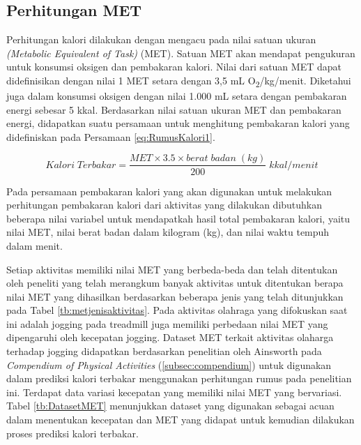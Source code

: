 \subsection{Perhitungan MET}
\label{subsec:PrediksiPerhitungan}

Perhitungan kalori dilakukan dengan mengacu pada nilai satuan ukuran \emph{(Metabolic Equivalent of Task)} (MET). Satuan MET akan mendapat pengukuran untuk konsumsi oksigen dan pembakaran kalori. Nilai dari satuan MET dapat didefinisikan dengan nilai 1 MET setara dengan 3,5 mL O\textsubscript{2}/kg/menit. Diketahui juga dalam konsumsi oksigen dengan nilai 1.000 mL setara dengan pembakaran energi sebesar 5 kkal. Berdasarkan nilai satuan ukuran MET dan pembakaran energi, didapatkan suatu persamaan untuk menghitung pembakaran kalori yang didefiniskan pada Persamaan \ref{eq:RumusKalori1}.

\setcounter{chapter}{2}
\setcounter{equation}{0}
\begin{equation}
  Kalori \; Terbakar = \frac{MET \times 3.5 \times berat \; badan \; (kg)}{200} \; kkal/menit
\end{equation}
\setcounter{chapter}{3}
\setcounter{equation}{4}

Pada persamaan pembakaran kalori yang akan digunakan untuk melakukan perhitungan pembakaran kalori dari aktivitas yang dilakukan dibutuhkan beberapa nilai variabel untuk mendapatkah hasil total pembakaran kalori, yaitu nilai MET, nilai berat badan dalam kilogram (kg), dan nilai waktu tempuh dalam menit.

Setiap aktivitas memiliki nilai MET yang berbeda-beda dan telah ditentukan oleh peneliti yang telah merangkum banyak aktivitas untuk ditentukan berapa nilai MET yang dihasilkan berdasarkan beberapa jenis yang telah ditunjukkan pada Tabel \ref{tb:metjenisaktivitas}. Pada aktivitas olahraga yang difokuskan saat ini adalah jogging pada treadmill juga memiliki perbedaan nilai MET yang dipengaruhi oleh kecepatan jogging. Dataset MET terkait aktivitas olaharga terhadap jogging didapatkan berdasarkan penelitian oleh Ainsworth pada \emph{Compendium of Physical Activities} (\ref{subsec:compendium}) untuk digunakan dalam prediksi kalori terbakar menggunakan perhitungan rumus pada penelitian ini. Terdapat data variasi kecepatan yang memiliki nilai MET yang bervariasi. Tabel \ref{tb:DatasetMET} menunjukkan dataset yang digunakan sebagai acuan dalam menentukan kecepatan dan MET yang didapat untuk kemudian dilakukan proses prediksi kalori terbakar.

